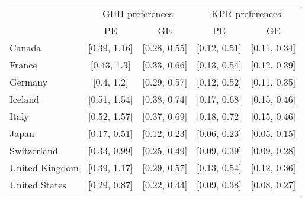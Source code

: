 \begin{tabular}{lcccc} 
& \multicolumn{2}{c}{GHH preferences}   & \multicolumn{2}{c}{KPR preferences}   \tabularnewline 
& PE                & GE                & PE                & GE                \tabularnewline 
\hline 
\hline 
Canada & {[}0.39, 1.16{]} & {[}0.28, 0.55{]} & {[}0.12, 0.51{]} & {[}0.11, 0.34{]} \tabularnewline 
France & {[}0.43, 1.3{]} & {[}0.33, 0.66{]} & {[}0.13, 0.54{]} & {[}0.12, 0.39{]} \tabularnewline 
Germany & {[}0.4, 1.2{]} & {[}0.29, 0.57{]} & {[}0.12, 0.52{]} & {[}0.11, 0.35{]} \tabularnewline 
Iceland & {[}0.51, 1.54{]} & {[}0.38, 0.74{]} & {[}0.17, 0.68{]} & {[}0.15, 0.46{]} \tabularnewline 
Italy & {[}0.52, 1.57{]} & {[}0.37, 0.69{]} & {[}0.18, 0.72{]} & {[}0.15, 0.46{]} \tabularnewline 
Japan & {[}0.17, 0.51{]} & {[}0.12, 0.23{]} & {[}0.06, 0.23{]} & {[}0.05, 0.15{]} \tabularnewline 
Switzerland & {[}0.33, 0.99{]} & {[}0.25, 0.49{]} & {[}0.09, 0.39{]} & {[}0.09, 0.28{]} \tabularnewline 
United Kingdom & {[}0.39, 1.17{]} & {[}0.29, 0.57{]} & {[}0.13, 0.54{]} & {[}0.12, 0.36{]} \tabularnewline 
United States & {[}0.29, 0.87{]} & {[}0.22, 0.44{]} & {[}0.09, 0.38{]} & {[}0.08, 0.27{]} \tabularnewline 
\hline 
\end{tabular} 
